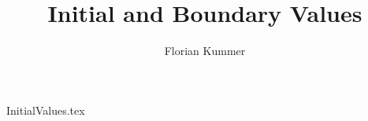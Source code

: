 \documentclass[10pt,a4paper]{article}
\title{Initial and Boundary Values}
\author{Florian Kummer}
\begin{document}
\maketitle

{InitialValues.tex}
\end{document}
